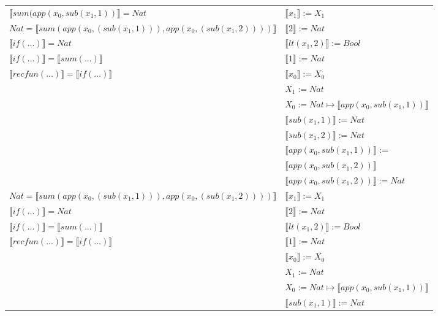 \begin{exercise}
\begin{description}
\begin{center}
\begin{longtable}{ | l | l | }
                    \hline 
                        $ \llbracket sum(app(x_0, sub(x_1,1)) \rrbracket = Nat$ & $ \llbracket x_1 \rrbracket := X_1$\\ 
                        $Nat =  \llbracket sum(app(x_0, (sub(x_1,1))), app(x_0, (sub(x_1,2)))) \rrbracket$ & $ \llbracket 2 \rrbracket := Nat$\\
                        $ \llbracket if(...) \rrbracket = Nat$ & $ \llbracket lt(x_1 , 2) \rrbracket := Bool$\\ 
                        $ \llbracket if(...) \rrbracket =  \llbracket sum(...) \rrbracket$ & $ \llbracket 1 \rrbracket := Nat$\\
                        $ \llbracket recfun(...) \rrbracket =  \llbracket if(...) \rrbracket$ & $ \llbracket x_0 \rrbracket := X_0$\\
                        &  $X_1 := Nat$\\ 
                        & $X_0 := Nat \mapsto  \llbracket app(x_0, sub(x_1,1)) \rrbracket$\\
			     & $ \llbracket sub(x_1,1) \rrbracket := Nat$\\
			     & $ \llbracket sub(x_1,2) \rrbracket := Nat$ \\
			     & $ \llbracket app(x_0, sub(x_1,1)) \rrbracket$ := \\
			     & $ \llbracket app(x_0, sub(x_1,2)) \rrbracket$\\ 
			     & $ \llbracket app(x_0, sub(x_1,2)) \rrbracket := Nat$ \\
                    \hline 
                        $Nat =  \llbracket sum(app(x_0, (sub(x_1,1))), app(x_0, (sub(x_1,2)))) \rrbracket$ &  $ \llbracket x_1 \rrbracket := X_1$\\
                        $ \llbracket if(...) \rrbracket = Nat$ & $ \llbracket 2 \rrbracket := Nat$\\
                        $ \llbracket if(...) \rrbracket =  \llbracket sum(...) \rrbracket$ & $ \llbracket lt(x_1 , 2) \rrbracket := Bool$\\
                        $ \llbracket recfun(...) \rrbracket =  \llbracket if(...) \rrbracket$ & $ \llbracket 1 \rrbracket := Nat$\\
                        & $ \llbracket x_0 \rrbracket := X_0$\\ 
                        &  $X_1 := Nat$\\  
			     & $X_0 := Nat \mapsto  \llbracket app(x_0, sub(x_1,1)) \rrbracket$\\
			     & $ \llbracket sub(x_1,1) \rrbracket := Nat$\\

\end{longtable}
\end{center}
\end{description}
\end{exercise}
